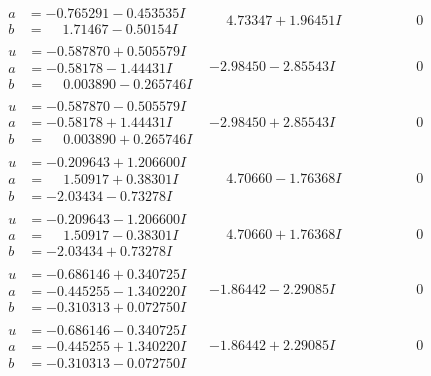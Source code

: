 \documentclass[1p]{elsarticle_modified}
\theoremstyle{definition}
\begin{document}
$$\begin{array}{c|c|c}
\begin{aligned}
a &= -0.765291 - 0.453535 I \\
b &= \phantom{-}1.71467 - 0.50154 I\end{aligned}
 & \phantom{-}4.73347 + 1.96451 I & \phantom{-0.000000 } 0 \\ \hline\begin{aligned}
u &= -0.587870 + 0.505579 I \\
a &= -0.58178 - 1.44431 I \\
b &= \phantom{-}0.003890 - 0.265746 I\end{aligned}
 & -2.98450 - 2.85543 I & \phantom{-0.000000 } 0 \\ \hline\begin{aligned}
u &= -0.587870 - 0.505579 I \\
a &= -0.58178 + 1.44431 I \\
b &= \phantom{-}0.003890 + 0.265746 I\end{aligned}
 & -2.98450 + 2.85543 I & \phantom{-0.000000 } 0 \\ \hline\begin{aligned}
u &= -0.209643 + 1.206600 I \\
a &= \phantom{-}1.50917 + 0.38301 I \\
b &= -2.03434 - 0.73278 I\end{aligned}
 & \phantom{-}4.70660 - 1.76368 I & \phantom{-0.000000 } 0 \\ \hline\begin{aligned}
u &= -0.209643 - 1.206600 I \\
a &= \phantom{-}1.50917 - 0.38301 I \\
b &= -2.03434 + 0.73278 I\end{aligned}
 & \phantom{-}4.70660 + 1.76368 I & \phantom{-0.000000 } 0 \\ \hline\begin{aligned}
u &= -0.686146 + 0.340725 I \\
a &= -0.445255 - 1.340220 I \\
b &= -0.310313 + 0.072750 I\end{aligned}
 & -1.86442 - 2.29085 I & \phantom{-0.000000 } 0 \\ \hline\begin{aligned}
u &= -0.686146 - 0.340725 I \\
a &= -0.445255 + 1.340220 I \\
b &= -0.310313 - 0.072750 I\end{aligned}
 & -1.86442 + 2.29085 I & \phantom{-0.000000 } 0 \\ \hline\begin{aligned}

\end{aligned}
\end{array}$$
\end{document}
